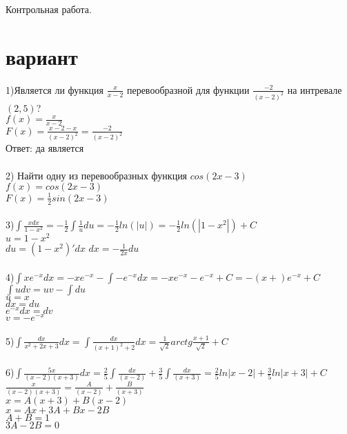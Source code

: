 \documentclass[a4paper]{article}
\begin{document}
    \begin{center} 
        \LARGE Контрольная работа.\\
    \end{center}
    \newpage
    \section{вариант}
    1)Является ли функция $\frac{x}{x-2}$ перевообразной для функции $\frac{-2}{(x-2)^2}$ на интревале $(2,5)$?\\
    $f(x)=\frac{x}{x-2}$\\
    $F(x)=\frac{x-2-x}{(x-2)^2}=\frac{-2}{(x-2)^2}$\\
    Ответ: да является\\\\
    2) Найти одну из перевообразных функция $cos(2x-3)$\\
    $f(x)=cos(2x-3)$\\
    $F(x)=\frac{1}{2}sin(2x-3)$\\\\
    3)$\int\frac{x dx}{1-x^2}=-\frac{1}{2}\int\frac{1}{u}du=-\frac{1}{2}ln(|u|)=-\frac{1}{2}ln(|1-x^2|)+C$\\
    $u=1-x^2$\\
    $du=(1-x^2)'dx$ $dx=-\frac{1}{2x}du$\\\\
    4)$\int xe^{-x}dx=-xe^{-x}-\int -e^{-x}dx=-xe^{-x}-e^{-x}+C=-(x+)e^{-x}+C$\\
    $\int udv=uv-\int du$\\
    $u=x$\\
    $dx=du$\\
    $e^{-x}dx=dv$\\
    $v=-e^{-x}$\\\\
    5)$\int \frac{dx}{x^2+2x+3}dx
    =\int \frac{dx}{(x+1)^2+2}dx
    =\frac{1}{\sqrt{2}}arctg\frac{x+1}{\sqrt{2}}+C$\\\\
    6)$\int \frac{5x}{(x-2)(x+3)}dx
    =\frac{2}{5}\int \frac{dx}{(x-2)}+\frac{3}{5}\int \frac{dx}{(x+3)}
    =\frac{2}{5}ln|x-2|+\frac{3}{5}ln|x+3|+C$\\
    $\frac{x}{(x-2)(x+3)}=\frac{A}{(x-2)}+\frac{B}{(x+3)}$\\
    $x=A(x+3)+B(x-2)$\\
    $x=Ax+3A+Bx-2B$\\
    $A+B=1$\\
    $3A-2B=0$\\
\end{document}
